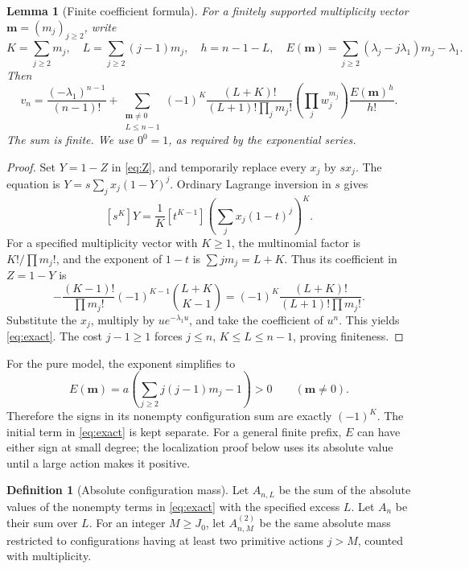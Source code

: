 \documentclass[11pt,a4paper]{article}
\numberwithin{equation}{section}
\newtheorem{lemma}[theorem]{Lemma}
\theoremstyle{definition}\newtheorem{definition}[theorem]{Definition}
\theoremstyle{remark}\newtheorem{remark}[theorem]{Remark}
\theoremstyle{definition}
\begin{document}
\begin{lemma}[Finite coefficient formula]
\label{lem:exact}
For a finitely supported multiplicity vector \(\bm m=(m_j)_{j\ge2}\), write
\begin{equation}
 K=\sum_{j\ge2}m_j,\quad L=\sum_{j\ge2}(j-1)m_j,\quad
 h=n-1-L,\quad E(\bm m)=\sum_{j\ge2}(\lambda_j-j\lambda_1)m_j-\lambda_1.
 \label{eq:config}
\end{equation}
Then
\begin{equation}
 v_n=\frac{(-\lambda_1)^{n-1}}{(n-1)!}
 +\sum_{\substack{\bm m\ne0\\L\le n-1}}
 (-1)^K\frac{(L+K)!}{(L+1)!\prod_jm_j!}
 \left(\prod_jw_j^{m_j}\right)\frac{E(\bm m)^h}{h!}.
 \label{eq:exact}
\end{equation}
The sum is finite. We use \(0^0=1\), as required by the exponential series.
\end{lemma}
\begin{proof}
Set \(Y=1-Z\) in \eqref{eq:Z}, and temporarily replace every \(x_j\) by
\(sx_j\). The equation is \(Y=s\sum_jx_j(1-Y)^j\). Ordinary Lagrange
inversion in \(s\) gives
\[
 [s^K]Y=\frac1K[t^{K-1}]\left(\sum_jx_j(1-t)^j\right)^K.
\]
For a specified multiplicity vector with \(K\ge1\), the multinomial factor
is \(K!/\prod m_j!\), and the exponent of \(1-t\) is
\(\sum jm_j=L+K\). Thus its coefficient in \(Z=1-Y\) is
\[
 -\frac{(K-1)!}{\prod m_j!}(-1)^{K-1}
   \binom{L+K}{K-1}
 =(-1)^K\frac{(L+K)!}{(L+1)!\prod m_j!}.
\]
Substitute the \(x_j\), multiply by \(ue^{-\lambda_1u}\), and take the
coefficient of \(u^n\). This yields \eqref{eq:exact}. The cost \(j-1\ge1\)
forces \(j\le n\), \(K\le L\le n-1\), proving finiteness.
\end{proof}

For the pure model, the exponent simplifies to
\begin{equation}
 E(\bm m)=a\left(\sum_{j\ge2}j(j-1)m_j-1\right)>0
 \qquad(\bm m\ne0).
 \label{eq:pureE}
\end{equation}
Therefore the signs in its nonempty configuration sum are exactly
\((-1)^K\). The initial term in \eqref{eq:exact} is kept separate.
For a general finite prefix, \(E\) can have either sign at small degree;
the localization proof below uses its absolute value until a large action
makes it positive.

\begin{definition}[Absolute configuration mass]
Let \(A_{n,L}\) be the sum of the absolute values of the nonempty terms
in \eqref{eq:exact} with the specified excess \(L\). Let \(A_n\) be their
sum over \(L\). For an integer \(M\ge J_0\), let \(A_{n,M}^{(2)}\) be the
same absolute mass restricted to configurations having at least two
primitive actions \(j>M\), counted with multiplicity.
\end{definition}
\end{document}
